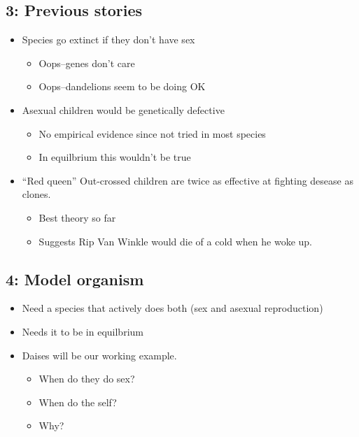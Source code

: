 \documentclass[12pt,twocolumn]{article}
\begin{document}
\newpage
\subsection*{3: Previous stories}

\begin{itemize}
\item Species go extinct if they don't have sex
\begin{itemize}
\item Oops--genes don't care
\item Oops--dandelions seem to be doing OK
\end{itemize}
\item Asexual children would be genetically defective
\begin{itemize}
\item No empirical evidence since not tried in most species
\item In equilbrium this wouldn't be true
\end{itemize}
\item ``Red queen'' Out-crossed children are twice as effective at
fighting desease as clones.  
\begin{itemize}
\item Best theory so far
\item Suggests Rip Van Winkle would die of a cold when he woke up. 
\end{itemize}
\end{itemize}

\subsection*{4: Model organism}

\begin{itemize}
\item Need a species that actively does both (sex and asexual
reproduction) 
\item Needs it to be in equilbrium
\item Daises will be our working example.
\begin{itemize}
\item When do they do sex?  
\item When do the self?
\item Why?
\end{itemize}
\end{itemize}
\newpage
\end{document}
